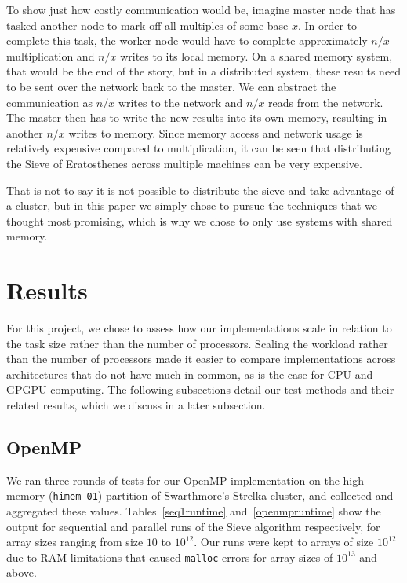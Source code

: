 \documentclass[11pt,twocolumn]{article}
\begin{document}
To show just how costly communication would be, imagine master node 
that has tasked another node to mark off all multiples of some base $x$. 
In order to complete this task, the worker node would have to complete approximately
$n/x$ multiplication and $n/x$ writes to its local memory. On a shared
memory system, that would be the end of the story, but in a distributed
system, these results need to be sent over the network back to the master.
We can abstract the communication as $n/x$ writes to the network and $n/x$ reads
from the network. The master then has to write the new results into
its own memory, resulting in another $n/x$ writes to memory. Since
memory access and network usage is relatively expensive compared to
multiplication, it can be seen that distributing the Sieve of Eratosthenes
across multiple machines can be very expensive.

That is not to say it is not possible to distribute the sieve and take
advantage of a cluster, but in this paper we simply chose to pursue the
techniques that we thought most promising, which is why we chose to
only use systems with shared memory.

\section {Results}\label{results}
For this project, we chose to assess how our implementations scale
in relation to the task size rather than the number
of processors. Scaling the workload rather than the number of processors
made it easier to compare implementations across
architectures that do not have much in common, as is the case for CPU and GPGPU
computing. The following subsections detail our test methods and their related
results, which we discuss in a later subsection.

\subsection{OpenMP}
We ran three rounds of tests for our OpenMP implementation on the high-memory
(\texttt{himem-01}) partition of Swarthmore's Strelka cluster, and collected 
and aggregated these values. Tables~\ref{seq1runtime} and~\ref{openmpruntime} 
show the output for sequential and parallel runs of the Sieve algorithm
respectively, for array sizes ranging from size $10$ to $10^{12}$. Our runs were kept to
arrays of size $10^{12}$ due to RAM limitations that caused \texttt{malloc} errors
for array sizes of $10^{13}$ and above.
\end{document}
